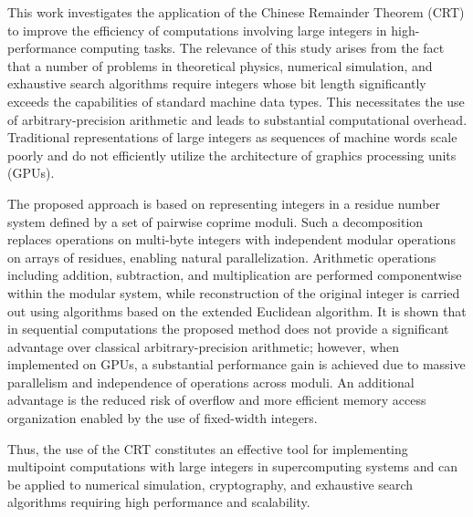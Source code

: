 \documentclass{crm-article}
\begin{document}

\begin{abstracteng}
This work investigates the application of the Chinese Remainder Theorem (CRT) to improve the efficiency of computations involving large integers in high-performance computing tasks. The relevance of this study arises from the fact that a number of problems in theoretical physics, numerical simulation, and exhaustive search algorithms require integers whose bit length significantly exceeds the capabilities of standard machine data types. This necessitates the use of arbitrary-precision arithmetic and leads to substantial computational overhead. Traditional representations of large integers as sequences of machine words scale poorly and do not efficiently utilize the architecture of graphics processing units (GPUs).

The proposed approach is based on representing integers in a residue number system defined by a set of pairwise coprime moduli. Such a decomposition replaces operations on multi-byte integers with independent modular operations on arrays of residues, enabling natural parallelization. Arithmetic operations including addition, subtraction, and multiplication are performed componentwise within the modular system, while reconstruction of the original integer is carried out using algorithms based on the extended Euclidean algorithm. It is shown that in sequential computations the proposed method does not provide a significant advantage over classical arbitrary-precision arithmetic; however, when implemented on GPUs, a substantial performance gain is achieved due to massive parallelism and independence of operations across moduli. An additional advantage is the reduced risk of overflow and more efficient memory access organization enabled by the use of fixed-width integers.

Thus, the use of the CRT constitutes an effective tool for implementing multipoint computations with large integers in supercomputing systems and can be applied to numerical simulation, cryptography, and exhaustive search algorithms requiring high performance and scalability.
\end{abstracteng}


\maketitle
\end{document}
